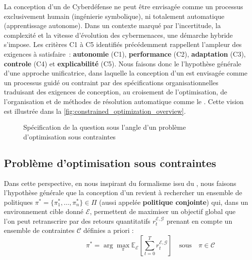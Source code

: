 La conception d'un  de Cyberdéfense ne peut être envisagée comme un processus exclusivement humain (ingénierie symbolique), ni totalement automatique (apprentissage autonome). Dans un contexte marqué par l'incertitude, la complexité et la vitesse d'évolution des cybermenaces, une démarche hybride s'impose.
%
Les critères C1 à C5 identifiés précédemment rappellent l'ampleur des exigences à satisfaire~: \textbf{autonomie} (C1), \textbf{performance} (C2), \textbf{adaptation} (C3), \textbf{controle} (C4) et \textbf{explicabilité} (C5).
%
Nous faisons donc le l'hypothèse générale d'une approche unificatrice, dans laquelle la conception d'un  est envisagée comme un processus guidé ou contraint par des spécifications organisationnelles traduisant des exigences de conception, au croisement de l'optimisation, de l'organisation et de méthodes de résolution automatique comme le . Cette vision est illustrée dans la \autoref{fig:constrained_optimization_overview}.

\begin{figure}[h!]
  \centering
  \resizebox{\textwidth}{!}{%
    
  }
  \caption{Spécification de la question sous l'angle d'un problème d'optimisation sous contraintes}
  \label{fig:constrained_optimization_overview}
\end{figure}

\subsection{Problème d'optimisation sous contraintes}

Dans cette perspective, en nous inspirant du formalisme issu du , nous faisons l'hypothèse générale que la conception d'un  revient à rechercher un ensemble de politiques $\pi^* = \{\pi^*_1, \dots, \pi^*_n\} \in \Pi$ (aussi appelée \textbf{politique conjointe}) qui, dans un environnement cible donné $\mathcal{E}$, permettent de maximiser un objectif global que l'on peut retranscrire par des retours quantitatifs $r^{\mathcal{E}, \mathcal{G}}_t$ prenant en compte un ensemble de contraintes $\mathcal{C}$ définies a priori :
%
\[
  \hspace{3cm}\pi^* = \arg\max_{\pi} \mathbb{E}_{\mathcal{E}} \left[ \sum_{t=0}^{T} r^{\mathcal{E}, \mathcal{G}}_t \right] \quad \text{sous} \quad \pi \in \mathcal{C}
\]


